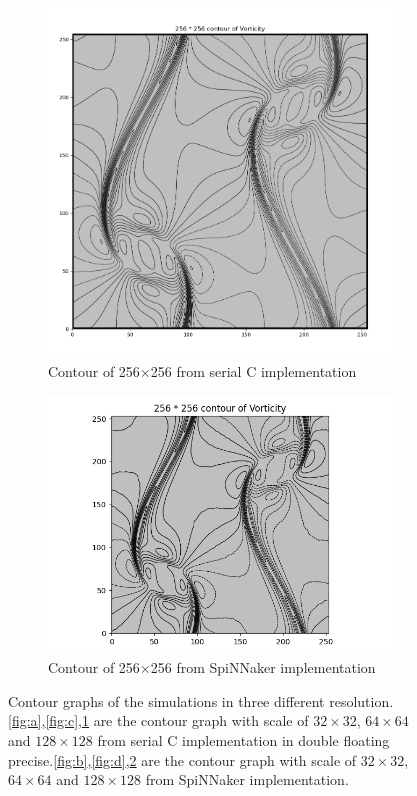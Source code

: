 \begin{figure}[htbp]
\medskip
\begin{subfigure}{0.43\textwidth}
\includegraphics[width=\linewidth]{figures/double_c_256.png}
\caption{Contour of 256$\times$256 from serial C implementation} \label{fig:e}
\end{subfigure}\hspace*{\fill}
\begin{subfigure}{0.57\textwidth}
\includegraphics[width=\linewidth]{figures/spinnaker_256.png}
\caption{Contour of 256$\times$256 from SpiNNaker implementation} \label{fig:f}
\end{subfigure}
\caption{Contour graphs of the simulations in three different resolution. \ref{fig:a},\ref{fig:c},\ref{fig:e} are the contour graph with scale of $32\times32$, $64\times64$ and $128\times128$ from serial C implementation in double floating precise.\ref{fig:b},\ref{fig:d},\ref{fig:f} are the contour graph with scale of $32\times32$, $64\times64$ and $128\times128$ from SpiNNaker implementation.} 
\label{fig:contour}
\end{figure}

